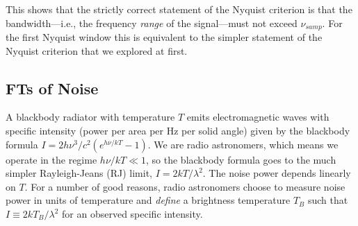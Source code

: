 \documentclass[12pt,preprint]{aastex}
\begin{document}
This shows that the strictly correct statement of the Nyquist criterion
is that the bandwidth---i.e., the frequency {\it range} of the
signal---must not exceed $\nu_{samp}$. For the first Nyquist window this
is equivalent to the simpler statement of the Nyquist criterion that we
explored at first.

\subsection{FTs of Noise}

A blackbody radiator with temperature $T$ emits electromagnetic waves
with specific intensity (power per area per Hz per solid angle) given by the 
blackbody formula $I=
2h\nu^3/c^2(e^{h\nu/kT}-1)$. We are radio astronomers, which means we
operate in the regime $h\nu/kT \ll 1$, so the blackbody formula
goes to the much simpler Rayleigh-Jeans (RJ) limit,
$I=2kT/\lambda^2$. The noise power depends linearly on $T$. 
For a number of good reasons, radio astronomers choose to measure noise
power in units of temperature and {\it define} a brightness temperature
$T_B$ such that $I\equiv2kT_B/\lambda^2$ for an observed specific intensity.
\end{document}
